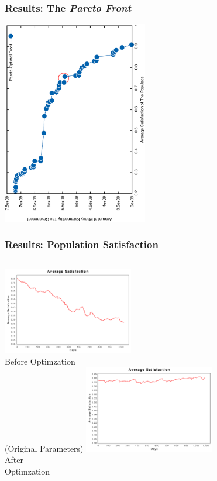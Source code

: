 \documentclass{beamer}
\begin{document}
\begin{frame}
	\frametitle{Results: The \emph{Pareto Front}}
	\centering
	\includegraphics[width=2.5in,keepaspectratio,angle=270]{front.eps}
\end{frame}
\begin{frame}
	\frametitle{Results: Population Satisfaction}
	\begin{columns}[c]
	\column{2.5in}
		\centering
		\includegraphics[width=2.25in,keepaspectratio]{average-satisfaction-old.pdf}\\
		Before Optimzation \\(Original Parameters)
	\column{2.5in}
		\centering
		\includegraphics[width=2.25in,keepaspectratio]{average-satisfaction-new.pdf}\\
		After\\ Optimzation
	\end{columns}
\end{frame}
\end{document}
